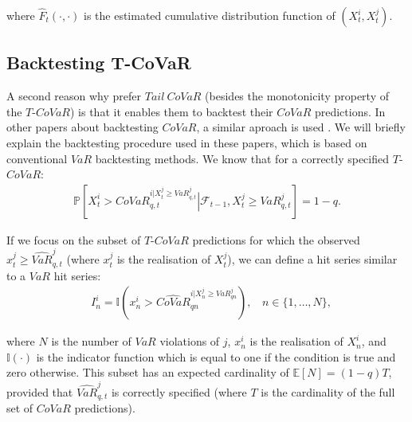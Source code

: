 \documentclass[12pt]{article}
\begin{document}
\noindent where $\widehat{F}_t\left(\cdot,\cdot\right)$ is the estimated cumulative distribution function of $(X^i_t,X^j_t)$.



\subsection{Backtesting T-CoVaR} \label{backineq}

A second reason why \citet{girardi} prefer $Tail\ CoVaR$ (besides the monotonicity property of the $T$-$CoVaR$) is that it enables them to backtest their $CoVaR$ predictions. In other papers about backtesting $CoVaR$, a similar aproach is used \citep{copulas,mesbacktest}. We will briefly explain the backtesting procedure used in these papers, which is based on conventional $VaR$ backtesting methods. We know that for a correctly specified $T$-$CoVaR$:
\begin{align}
\mathbb{P}\left[X^{i}_t>CoVaR_{q,t}^{i|X^{j}_t\geq VaR_{q,t}^{j}}\left|\mathcal{F}_{t-1},X^{j}_t\geq VaR_{q,t}^{j}\right.\right]=1-q  . \label{eq211}
\end{align}

\noindent If we focus on the subset of $T$-$CoVaR$ predictions for which the observed  $x^{j}_t\geq \widehat{VaR}_{q,t}^{j}$ (where $x^j_t$ is the realisation of $X^j_t$), we can define a hit series similar to a $VaR$ hit series:
\begin{align}
& I^i_n=\mathbb{I}\left(x^{i}_n>\widehat{CoVaR}_{qn}^{i|X^{j}_n\geq VaR_{qn}^{j}}\right), \ \ \ \ n\in \{1,\ldots,N\}, \label{Idef}
\end{align}

\noindent where $N$ is the number of $VaR$ violations of $j$, $x^{i}_n$ is the realisation of $X^{i}_n$, and $\mathbb{I}\left(\cdot\right)$ is the indicator function which is equal to one if the condition is true and zero otherwise. This subset has an expected cardinality of $\mathbb{E}\left[N\right]=(1-q) T$, provided that $\widehat{VaR}^j_{q,t}$ is correctly specified (where $T$ is the cardinality of the full set of $CoVaR$ predictions).
\end{document}
